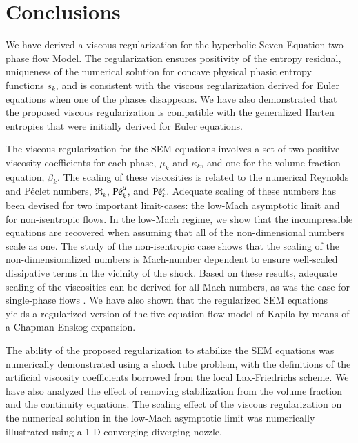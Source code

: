 %

\section{Conclusions}\label{sec:conclusion}
%
We have derived a viscous regularization for the hyperbolic Seven-Equation two-phase flow Model. The regularization ensures positivity of the entropy residual, 
uniqueness of the numerical solution for concave physical phasic entropy functions $s_k$, and is consistent with the viscous regularization derived for 
Euler equations when one of the phases disappears. 
We have also demonstrated that the proposed viscous regularization is compatible with the generalized Harten entropies that were initially derived for Euler equations. 

The viscous regularization for the SEM equations involves a set of two positive viscosity coefficients for each phase, $\mu_k$ and $\kappa_k$, and one for the volume 
fraction equation, $\beta_k$. The scaling of these viscosities is related to the numerical Reynolds and P\'eclet numbers, $\Re_k$, $\textrm{P\'e}_k^\mu$, and $\textrm{P\'e}_k^\kappa$. 
Adequate scaling of these numbers has been devised for two important limit-cases: the low-Mach asymptotic limit and for non-isentropic flows. In the low-Mach regime, 
we show that the incompressible equations are recovered when assuming that all of the non-dimensional numbers scale as one. The study of the non-isentropic case 
shows that the scaling of the non-dimensionalized numbers is Mach-number dependent to ensure well-scaled dissipative terms in the vicinity of the shock.
Based on these results, adequate scaling of the viscosities can be derived for all Mach numbers, as was the case for single-phase flows \cite{Marco_paper_low_mach}. 
%
We have also shown that the regularized SEM equations yields a regularized version of the five-equation flow model of Kapila by means of a Chapman-Enskog expansion.

The ability of the proposed regularization to stabilize the SEM equations was numerically demonstrated using a shock tube problem, with the definitions of the 
artificial viscosity coefficients borrowed from the local Lax-Friedrichs scheme. We have also analyzed the effect of removing stabilization from the volume fraction 
and the continuity equations. The scaling effect of the viscous regularization on the numerical solution in the low-Mach asymptotic limit was numerically illustrated using a 1-D converging-diverging nozzle.

